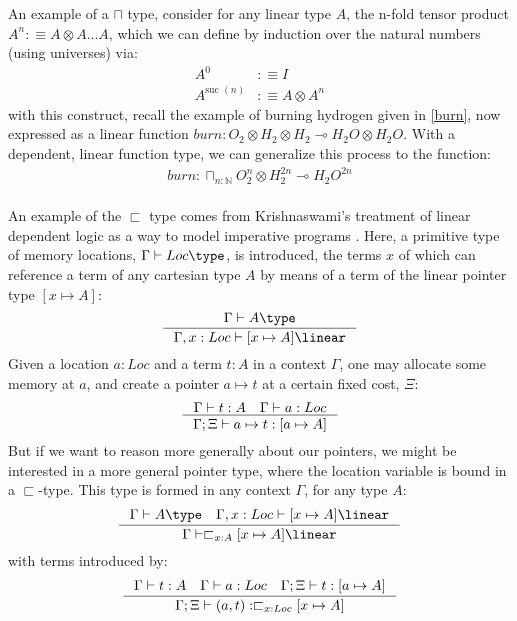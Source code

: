 An example of a $\sqcap$ type, consider for any linear type $A$, the n-fold tensor product $A^n :\equiv A \otimes A \dots A$, which we can define by induction over the natural numbers (using universes) via:
\[
  \begin{split}
  A^0 &:\equiv I\\
  A^{\text{suc }(n)} &:\equiv A \otimes A^n
  \end{split}
\]
with this construct, recall the example of burning hydrogen given in \ref{burn}, now expressed as a linear function $burn : O_2 \otimes H_2 \otimes H_2 \multimap H_2O \otimes H_2O$. With a dependent, linear function type, we can generalize this process to the function:
\[
  \begin{split}
  burn : \sqcap_{n : \mathbb{N}}O_2^n \otimes H_2^{2n} \multimap H_2O^{2n}
  \end{split}
\]
\\
An example of the $\sqsubset$ type comes from Krishnaswami's treatment of linear dependent logic as a way to model imperative programs \cite{krishnaswami}. Here, a primitive type of memory locations, $\Gamma \vdash Loc \type$, is introduced, the terms $x$ of which can reference a term of any cartesian type $A$ by means of a term of the linear pointer type $[x \mapsto A]$:
\[ 
  \inference{\Gamma \vdash A \type}
  {\Gamma, x : Loc \vdash [x \mapsto A] \linear}
\]
Given a location $a : Loc$ and a term $t : A$ in a context $\Gamma$, one may allocate some memory at $a$, and create a pointer $a \mapsto t$ at a certain fixed cost, $\Xi$:
\[
  \inference{\Gamma \vdash t : A \quad \Gamma \vdash a : Loc}
  {\Gamma; \Xi \vdash a \mapsto t : [a \mapsto A]}
\]
But if we want to reason more generally about our pointers, we might be interested in a more general pointer type, where the location variable is bound in a $\sqsubset$-type. This type is formed in any context $\Gamma$, for any type $A$:
\[
  \inference{\Gamma \vdash A \type \quad \Gamma, x : Loc \vdash [x \mapsto A] \linear} 
  {\Gamma \vdash \sqsubset_{x : A}[x \mapsto A] \linear}
\]
with terms introduced by:
\[
  \inference{\Gamma \vdash t : A \quad \Gamma \vdash a : Loc \quad \Gamma; \Xi \vdash t : [a \mapsto A]}
  {\Gamma; \Xi \vdash (a, t) : \sqsubset_{x : Loc} [x \mapsto A]}
\]

